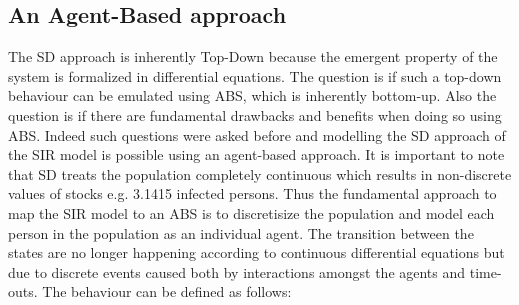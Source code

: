 \subsection{An Agent-Based approach}
The SD approach is inherently Top-Down because the emergent property of the system is formalized in differential equations. The question is if such a top-down behaviour can be emulated using ABS, which is inherently bottom-up. Also the question is if there are fundamental drawbacks and benefits when doing so using ABS. Indeed such questions were asked before and modelling the SD approach of the SIR model is possible using an agent-based approach. It is important to note that SD treats the population completely continuous which results in non-discrete values of stocks e.g. 3.1415 infected persons. Thus the fundamental approach to map the SIR model to an ABS is to discretisize the population and model each person in the population as an individual agent. The transition  between the states are no longer happening according to continuous differential equations but due to discrete events caused both by interactions amongst the agents and time-outs. The behaviour can be defined as follows:

